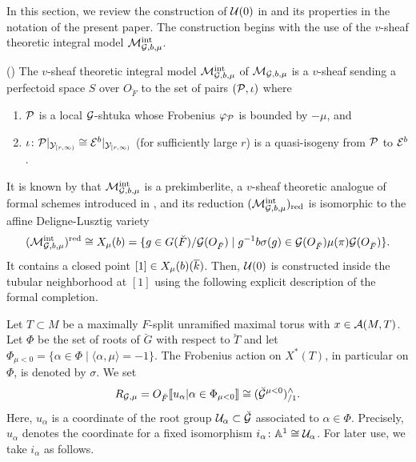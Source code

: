 \documentclass[12pt,reqno]{amsart}
\begin{document}
In this section, we review the construction of ${\mathcal{U}}(0)$ in \cite[Theorem 1]{Tak25z} and its properties in the notation of the present paper. The construction begins with the use of the $v$-sheaf theoretic integral model ${\mathcal{M}}^{\operatorname{int}}_{{\mathcal{G}}, b, \mu}$. 

\begin{defi}\textup{(\cite[Definition 25.1.1]{SW20})} \label{defi:v_sheaf_integral_model}
    The $v$-sheaf theoretic integral model ${\mathcal{M}}_{{\mathcal{G}},b,\mu}^{\operatorname{int}}$ of ${\mathcal{M}}_{{\mathcal{G}}, b, \mu}$ is a $v$-sheaf sending a perfectoid space $S$ over $O_{\breve{F}}$ to the set of pairs $({\mathcal{P}}, \iota)$ where 
    \begin{enumerate}
        \item ${\mathcal{P}}$ is a local ${\mathcal{G}}$-shtuka whose Frobenius $\varphi_{{\mathcal{P}}}$ is bounded by $-\mu$, and
        \item $\iota \colon {\mathcal{P}}\vert_{{\mathcal{Y}}_{[r, \infty)}} \cong {\mathcal{E}}^b\vert_{{\mathcal{Y}}_{[r, \infty)}}$ (for sufficiently large $r$) is a quasi-isogeny from ${\mathcal{P}}$ to ${\mathcal{E}}^b$. 
    \end{enumerate}
\end{defi}

It is known by \cite[{}2.61, 2.63]{Gle26_local_Shimura} that ${\mathcal{M}}^{\operatorname{int}}_{{\mathcal{G}}, b, \mu}$ is a prekimberlite, a $v$-sheaf theoretic analogue of formal schemes introduced in \cite{Gle24}, and its reduction $({\mathcal{M}}^{\operatorname{int}}_{{\mathcal{G}}, b, \mu})_{\operatorname{red}}$ is isomorphic to the affine Deligne-Lusztig variety 
\[
    ({\mathcal{M}}_{{\mathcal{G}}, b, \mu}^{\operatorname{int}})^{\operatorname{red}} \cong X_\mu(b) = \{ g \in G(\breve{F}) / {\mathcal{G}}(O_{\breve{F}}) \mid g^{-1} b \sigma(g) \in {\mathcal{G}}(O_{\breve{F}}) \mu(\pi) {\mathcal{G}}(O_{\breve{F}}) \}. 
\]
It contains a closed point $[1] \in X_\mu(b)({\overline{k}})$. Then, ${\mathcal{U}}(0)$ is constructed inside the tubular neighborhood at $[1]$ using the following explicit description of the formal completion. 

Let $T \subset M$ be a maximally $F$-split unramified maximal torus with $x \in {\mathcal{A}}(M, T)$. Let $\Phi$ be the set of roots of $\breve{G}$ with respect to $\breve{T}$ and let $\Phi_{\mu < 0} = \{ \alpha \in \Phi \mid \langle \alpha, \mu \rangle = -1 \}$. The Frobenius action on $X^*(T)$, in particular on $\Phi$, is denoted by $\sigma$. We set 
\[
    R_{{\mathcal{G}}, \mu} = O_{\breve{F}} \llbracket u_\alpha \vert \alpha \in \Phi_{\mu < 0} \rrbracket \cong ({\mathcal{\breve{G}}}^{\mu < 0})^\wedge_{/1}. 
\]
Here, $u_\alpha$ is a coordinate of the root group ${\mathcal{U}}_\alpha \subset {\mathcal{\breve{G}}}$ associated to $\alpha \in \Phi$. Precisely, $u_\alpha$ denotes the coordinate for a fixed isomorphism $i_\alpha \colon \mathbb{A}^1 \cong {\mathcal{U}}_\alpha$. For later use, we take $i_\alpha$ as follows. 
\end{document}
